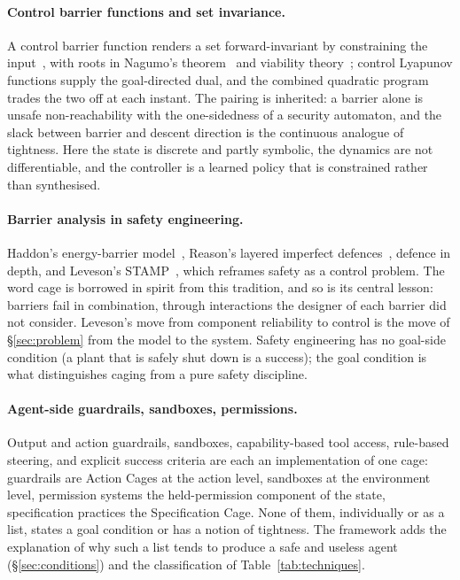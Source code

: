 \paragraph{Control barrier functions and set invariance.}
A control barrier function renders a set forward-invariant by constraining the input~\citep{ames2017cbf,ames2019cbf}, with roots in Nagumo's theorem~\citep{nagumo1942} and viability theory~\citep{aubin1991}; control Lyapunov functions supply the goal-directed dual, and the combined quadratic program trades the two off at each instant. The pairing is inherited: a barrier alone is unsafe non-reachability with the one-sidedness of a security automaton, and the slack between barrier and descent direction is the continuous analogue of tightness. Here the state is discrete and partly symbolic, the dynamics are not differentiable, and the controller is a learned policy that is constrained rather than synthesised.

\paragraph{Barrier analysis in safety engineering.}
Haddon's energy-barrier model~\citep{haddon1973}, Reason's layered imperfect defences~\citep{reason1990}, defence in depth, and Leveson's STAMP~\citep{leveson2011}, which reframes safety as a control problem. The word cage is borrowed in spirit from this tradition, and so is its central lesson: barriers fail in combination, through interactions the designer of each barrier did not consider. Leveson's move from component reliability to control is the move of \S\ref{sec:problem} from the model to the system. Safety engineering has no goal-side condition (a plant that is safely shut down is a success); the goal condition is what distinguishes caging from a pure safety discipline.

\paragraph{Agent-side guardrails, sandboxes, permissions.}
Output and action guardrails, sandboxes, capability-based tool access, rule-based steering, and explicit success criteria are each an implementation of one cage: guardrails are Action Cages at the action level, sandboxes at the environment level, permission systems the held-permission component of the state, specification practices the Specification Cage. None of them, individually or as a list, states a goal condition or has a notion of tightness. The framework adds the explanation of why such a list tends to produce a safe and useless agent (\S\ref{sec:conditions}) and the classification of Table~\ref{tab:techniques}.

